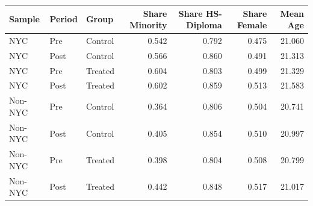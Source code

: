 
\begin{tabular}[t]{lllrrrr}
\toprule
Sample & Period & Group & Share Minority & Share HS-Diploma & Share Female & Mean Age\\
\midrule
NYC & Pre & Control & 0.542 & 0.792 & 0.475 & 21.060\\
NYC & Post & Control & 0.566 & 0.860 & 0.491 & 21.313\\
NYC & Pre & Treated & 0.604 & 0.803 & 0.499 & 21.329\\
NYC & Post & Treated & 0.602 & 0.859 & 0.513 & 21.583\\
Non-NYC & Pre & Control & 0.364 & 0.806 & 0.504 & 20.741\\
\addlinespace
Non-NYC & Post & Control & 0.405 & 0.854 & 0.510 & 20.997\\
Non-NYC & Pre & Treated & 0.398 & 0.804 & 0.508 & 20.799\\
Non-NYC & Post & Treated & 0.442 & 0.848 & 0.517 & 21.017\\
\bottomrule
\end{tabular}
